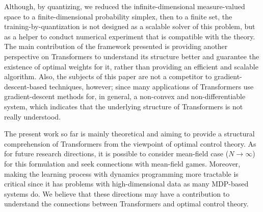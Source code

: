 \documentclass[11pt]{article}
\begin{document}
Although, by quantizing, we reduced the infinite-dimensional measure-valued space to a finite-dimensional probability simplex, then to a finite set, the training-by-quantization is not designed as a scalable solver of this problem, but as a helper to conduct numerical experiment that is compatible with the theory. The main contribution of the framework presented is providing another perspective on Transformers to understand its structure better and guarantee the existence of optimal weights for it, rather than providing an efficient and scalable algorithm. Also, the subjects of this paper are not a competitor to gradient-descent-based techniques, however; since many applications of Transformers use gradient-descent methods for, in general, a non-convex and non-differentiable system, which indicates that the underlying structure of Transformers is not really understood. 

The present work so far is mainly theoretical and aiming to provide a structural comprehension of Transformers from the viewpoint of optimal control theory. As for future research directions, it is possible to consider mean-field case ($N\to\infty$) for this formulation and seek connections with mean-field games. Moreover, making the learning process with dynamics programming more tractable is critical since it has problems with high-dimensional data as many MDP-based systems do. We believe that these directions may have a contribution to understand the connections between Transformers and optimal control theory.

\appendix
\end{document}
